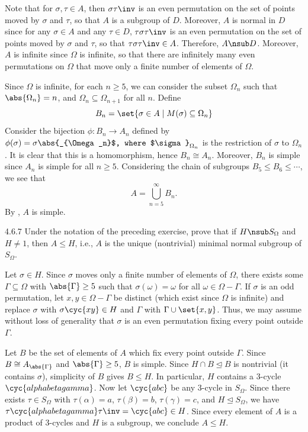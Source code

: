 \begin{sol}
	Note that for $\sigma, \tau \in A$, then $\sigma\tau\inv$ is an even permutation on the set of points moved by $\sigma$ and $\tau$, so that $A$ is a subgroup of $D$.
	Moreover, $A$ is normal in $D$ since for any $\sigma \in A$ and any $\tau \in D$, $\tau\sigma\tau\inv$ is an even permutation on the set of points moved by $\sigma$ and $\tau$, so that $\tau\sigma\tau\inv \in A$.
	Therefore, $A \nsub D$.
	Moreover, $A$ is infinite since $\Omega$ is infinite, so that there are infinitely many even permutations on $\Omega$ that move only a finite number of elements of $\Omega$.

	Since $\Omega$ is infinite, for each $n \geq 5$, we can consider the subset $\Omega_n$ such that $\abs{\Omega_n} = n$, and $\Omega_n \subseteq \Omega_{n + 1}$ for all $n$.
	Define
	\[
		B_n = \set{\sigma \in A \mid M(\sigma) \subseteq \Omega_n}
	\]
	Consider the bijection $\phi \colon B_n \to A_n$ defined by $\phi(\sigma) = \sigma\abs{_{\Omega_n}$, where $\sigma}_{\Omega_n}$ is the restriction of $\sigma$ to $\Omega_n$.
	It is clear that this is a homomorphism, hence $B_n \cong A_n$.
	Moreover, $B_n$ is simple since $A_n$ is simple for all $n \geq 5$.
	Considering the chain of subgroups $B_5 \leq B_6 \leq \cdots$, we see that
	\[
		A = \bigcup_{n = 5}^\infty B_n.
	\]
	By , $A$ is simple.
\end{sol}

\begin{exercise}{4.6.7}
	Under the notation of the preceding exercise, prove that if $H \nsub S_\Omega$ and $H \neq 1$, then $A \leq H$, i.e., $A$ is the unique (nontrivial) minimal normal subgroup of $S_\Omega$.
\end{exercise}

\begin{sol}
	Let $\sigma \in H$.
	Since $\sigma$ moves only a finite number of elements of $\Omega$, there exists some $\Gamma \subseteq \Omega$ with $\abs{\Gamma} \geq 5$ such that $\sigma(\omega) = \omega$ for all $\omega \in \Omega - \Gamma$.
	If $\sigma$ is an odd permutation, let $x, y \in \Omega - \Gamma$ be distinct (which exist since $\Omega$ is infinite) and replace $\sigma$ with $\sigma\cyc{x y} \in H$ and $\Gamma$ with $\Gamma \cup \set{x, y}$.
	Thus, we may assume without loss of generality that $\sigma$ is an even permutation fixing every point outside $\Gamma$. 

	Let $B$ be the set of elements of $A$ which fix every point outside $\Gamma$.
	Since $B \cong A_{\abs{\Gamma}}$ and $\abs{\Gamma} \geq 5$, $B$ is simple.
	Since $H \cap B \trianglelefteq B$ is nontrivial (it contains $\sigma$), simplicity of $B$ gives $B \leq H$.
	In particular, $H$ contains a 3-cycle $\cyc{alpha beta gamma}$.
	Now let $\cyc{a b c}$ be any 3-cycle in $S_\Omega$.
	Since there exists $\tau \in S_\Omega$ with $\tau(\alpha) = a$, $\tau(\beta) = b$, $\tau(\gamma) = c$, and $H \trianglelefteq S_\Omega$, we have $\tau\cyc{alpha beta gamma}\tau\inv = \cyc{a b c} \in H$.
	Since every element of $A$ is a product of 3-cycles and $H$ is a subgroup, we conclude $A \leq H$.
\end{sol}

